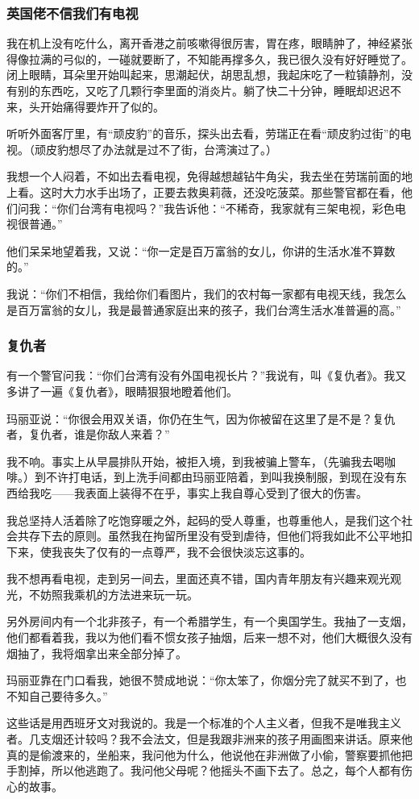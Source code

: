 \subsubsection*{英国佬不信我们有电视}
\par 我在机上没有吃什么，离开香港之前咳嗽得很厉害，胃在疼，眼睛肿了，神经紧张得像拉满的弓似的，一碰就要断了，不知能再撑多久，我已很久没有好好睡觉了。闭上眼睛，耳朵里开始叫起来，思潮起伏，胡思乱想，我起床吃了一粒镇静剂，没有别的东西吃，又吃了几颗行李里面的消炎片。躺了快二十分钟，睡眠却迟迟不来，头开始痛得要炸开了似的。
\par 听听外面客厅里，有“顽皮豹”的音乐，探头出去看，劳瑞正在看“顽皮豹过街”的电视。（顽皮豹想尽了办法就是过不了街，台湾演过了。）
\par 我想一个人闷着，不如出去看电视，免得越想越钻牛角尖，我去坐在劳瑞前面的地上看。这时大力水手出场了，正要去救奥莉薇，还没吃菠菜。那些警官都在看，他们问我：“你们台湾有电视吗？”我告诉他：“不稀奇，我家就有三架电视，彩色电视很普通。”
\par 他们呆呆地望着我，又说：“你一定是百万富翁的女儿，你讲的生活水准不算数的。”
\par 我说：“你们不相信，我给你们看图片，我们的农村每一家都有电视天线，我怎么是百万富翁的女儿，我是最普通家庭出来的孩子，我们台湾生活水准普遍的高。”
\subsubsection*{复仇者}
\par 有一个警官问我：“你们台湾有没有外国电视长片？”我说有，叫《复仇者》。我又多讲了一遍《复仇者》，眼睛狠狠地瞪着他们。
\par 玛丽亚说：“你很会用双关语，你仍在生气，因为你被留在这里了是不是？复仇者，复仇者，谁是你敌人来着？”
\par 我不响。事实上从早晨排队开始，被拒入境，到我被骗上警车，（先骗我去喝咖啡。）到不许打电话，到上洗手间都由玛丽亚陪着，到叫我换制服，到现在没有东西给我吃——我表面上装得不在乎，事实上我自尊心受到了很大的伤害。
\par 我总坚持人活着除了吃饱穿暖之外，起码的受人尊重，也尊重他人，是我们这个社会共存下去的原则。虽然我在拘留所里没有受到虐待，但他们将我如此不公平地扣下来，使我丧失了仅有的一点尊严，我不会很快淡忘这事的。
\par 我不想再看电视，走到另一间去，里面还真不错，国内青年朋友有兴趣来观光观光，不妨照我乘机的方法进来玩一玩。
\par 另外房间内有一个北非孩子，有一个希腊学生，有一个奥国学生。我抽了一支烟，他们都看着我，我以为他们看不惯女孩子抽烟，后来一想不对，他们大概很久没有烟抽了，我将烟拿出来全部分掉了。
\par 玛丽亚靠在门口看我，她很不赞成地说：“你太笨了，你烟分完了就买不到了，也不知自己要待多久。”
\par 这些话是用西班牙文对我说的。我是一个标准的个人主义者，但我不是唯我主义者。几支烟还计较吗？我不会法文，但是我跟非洲来的孩子用画图来讲话。原来他真的是偷渡来的，坐船来，我问他为什么，他说他在非洲做了小偷，警察要抓他把手割掉，所以他逃跑了。我问他父母呢？他摇头不画下去了。总之，每个人都有伤心的故事。
